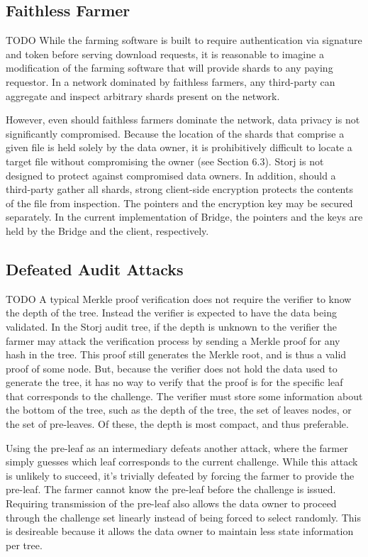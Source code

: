 \documentclass[a4paper,10pt]{article} \usepackage[utf8]{inputenc}
\newcommand{\todo}[1]{{\color{red} TODO #1}}
\begin{document}
\subsection{Faithless Farmer}

\todo{ While the farming software is built to require authentication via
signature and token before serving download requests, it is reasonable to
imagine a modification of the farming software that will provide shards to any
paying requestor. In a network dominated by faithless farmers, any third-party
can aggregate and inspect arbitrary shards present on the network.

However, even should faithless farmers dominate the network, data privacy is not
significantly compromised. Because the location of the shards that comprise a
given file is held solely by the data owner, it is prohibitively difficult to
locate a target file without compromising the owner (see Section 6.3). Storj is
not designed to protect against compromised data owners. In addition, should a
third-party gather all shards, strong client-side encryption protects the
contents of the file from inspection. The pointers and the encryption key may be
secured separately. In the current implementation of Bridge, the pointers and
the keys are held by the Bridge and the client, respectively. }

\subsection{Defeated Audit Attacks}

\todo{ A typical Merkle proof verification does not require the verifier to know
the depth of the tree. Instead the verifier is expected to have the data being
validated. In the Storj audit tree, if the depth is unknown to the verifier the
farmer may attack the verification process by sending a Merkle proof for any
hash in the tree. This proof still generates the Merkle root, and is thus a
valid proof of some node. But, because the verifier does not hold the data used
to generate the tree, it has no way to verify that the proof is for the specific
leaf that corresponds to the challenge. The verifier must store some information
about the bottom of the tree, such as the depth of the tree, the set of leaves
nodes, or the set of pre-leaves. Of these, the depth is most compact, and thus
preferable.

Using the pre-leaf as an intermediary defeats another attack, where the farmer
simply guesses which leaf corresponds to the current challenge. While this
attack is unlikely to succeed, it’s trivially defeated by forcing the farmer to
provide the pre-leaf. The farmer cannot know the pre-leaf before the challenge
is issued. Requiring transmission of the pre-leaf also allows the data owner to
proceed through the challenge set linearly instead of being forced to select
randomly. This is desireable because it allows the data owner to maintain less
state information per tree. }
\end{document}
